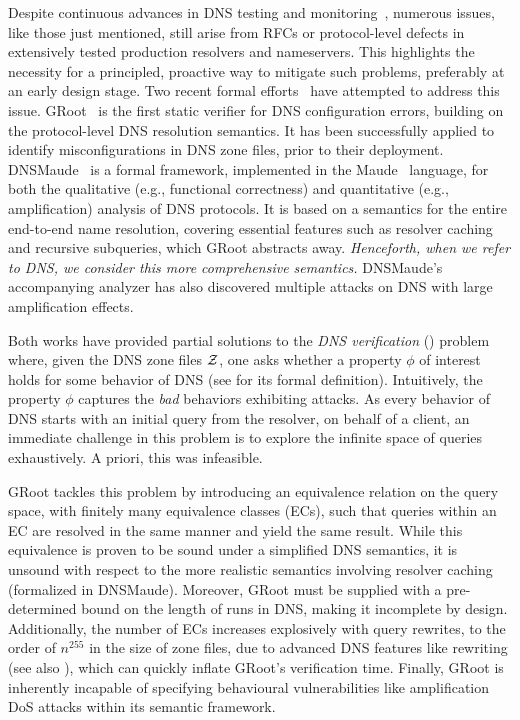 Despite continuous advances in DNS testing and monitoring~\cite{ResolFuzz,ResolverFuzz,thousandeyes,check-host,Eywa,scale}, 
numerous issues, like those just mentioned, still arise from RFCs or protocol-level defects in extensively tested production resolvers and nameservers. This highlights the necessity for 
a principled, proactive way to mitigate such problems, 
preferably at an early design stage. 
Two recent formal efforts~\cite{dnsmaude,groot} have attempted to address this issue. 
GRoot~\cite{groot} is the first static verifier for DNS configuration errors, building on the protocol-level DNS resolution semantics.
It has been successfully applied to identify 
misconfigurations in DNS zone files, prior to their deployment. 
DNSMaude~\cite{dnsmaude} is a formal framework, implemented in the Maude~\cite{DBLP:conf/maude/2007} language, 
for both the qualitative (e.g., functional correctness) and quantitative (e.g., amplification) analysis of  DNS protocols. 
It is based on a 
semantics for the entire end-to-end name resolution, 
 covering essential features such as resolver caching and recursive subqueries, which GRoot abstracts away.
\emph{Henceforth, when we refer to DNS, we consider this more comprehensive semantics.}
DNSMaude's accompanying analyzer has also discovered multiple attacks on DNS with large amplification effects. %


Both works have provided partial solutions to the \emph{DNS verification}   
() problem
where, 
given the DNS zone files $\cal Z$,
one asks whether a property $\phi$ of interest holds for some behavior of DNS (see   for its formal definition). 
Intuitively, the property $\phi$ captures the \emph{bad} behaviors exhibiting attacks. As every behavior of DNS starts with an initial query from the resolver, on behalf of a client, an immediate challenge in this problem is to explore the infinite space of queries exhaustively. A priori, this was infeasible.

GRoot tackles this problem by introducing an equivalence relation on the query space, with finitely many equivalence classes (ECs), such that queries within an EC are resolved in the same manner and yield the same result. While this equivalence is proven to be sound under a simplified DNS semantics, it is unsound with respect to the more realistic semantics involving resolver caching (formalized in DNSMaude). Moreover, GRoot must be supplied with a pre-determined bound on the length of runs in DNS, making it incomplete by design. Additionally, the number of ECs increases explosively with query rewrites, to the order of $n^{255}$ in the size of  zone files, due to advanced DNS features like  rewriting \cite{rfc6672} (see also ), which can quickly inflate GRoot's verification time. Finally, GRoot is inherently incapable of specifying behavioural vulnerabilities like amplification DoS attacks within its semantic framework.

